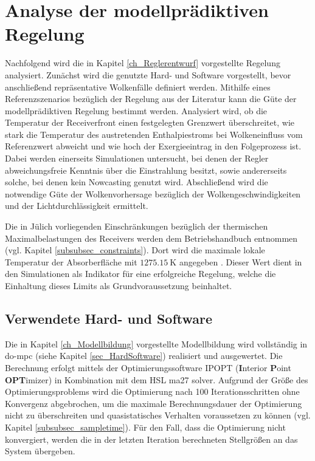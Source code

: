 \chapter{Analyse der modellprädiktiven Regelung} \label{ch_AnalyseRegelung}
Nachfolgend wird die in Kapitel \ref{ch_Reglerentwurf} vorgestellte Regelung analysiert.
Zunächst wird die genutzte Hard- und Software vorgestellt, bevor anschließend repräsentative Wolkenfälle definiert werden.
Mithilfe eines Referenzszenarios bezüglich der Regelung aus der Literatur kann die Güte der modellprädiktiven Regelung bestimmt werden.
Analysiert wird, ob die Temperatur der Receiverfront einen festgelegten Grenzwert überschreitet, wie stark die Temperatur des austretenden Enthalpiestroms bei Wolkeneinfluss vom Referenzwert abweicht und wie hoch der Exergieeintrag in den Folgeprozess ist.
Dabei werden einerseits Simulationen untersucht, bei denen der Regler abweichungsfreie Kenntnis über die Einstrahlung besitzt, sowie andererseits solche, bei denen kein Nowcasting genutzt wird.
Abschließend wird die notwendige Güte der Wolkenvorhersage bezüglich der Wolkengeschwindigkeiten und der Lichtdurchlässigkeit ermittelt.

Die in Jülich vorliegenden Einschränkungen bezüglich der thermischen Maximalbelastungen des Receivers werden dem Betriebshandbuch entnommen (vgl. Kapitel \ref{subsubsec_constraints}).
Dort wird die maximale lokale Temperatur der Absorberfläche mit $\SI{1275.15}{\kelvin}$ angegeben \cite[S.29]{HandbuchJülich}. Dieser Wert dient in den Simulationen als Indikator für eine erfolgreiche Regelung, welche die Einhaltung dieses Limits als Grundvoraussetzung beinhaltet.

\section{Verwendete Hard- und Software} \label{sec_Hardsoftanalyse}
Die in Kapitel \ref{ch_Modellbildung} vorgestellte Modellbildung wird vollständig in do-mpc (siehe Kapitel \ref{sec_HardSoftware}) realisiert und ausgewertet.
Die Berechnung erfolgt mittels der Optimierungssoftware IPOPT (\textbf{I}nterior \textbf{P}oint \textbf{OPT}imizer) in Kombination mit dem HSL ma27 solver.
Aufgrund der Größe des Optimierungsproblems wird die Optimierung nach 100 Iterationsschritten ohne Konvergenz abgebrochen, um die maximale Berechnungsdauer der Optimierung nicht zu überschreiten und quasistatisches Verhalten voraussetzen zu können (vgl. Kapitel \ref{subsubsec_sampletime}).
Für den Fall, dass die Optimierung nicht konvergiert, werden die in der letzten Iteration berechneten Stellgrößen an das System übergeben.

